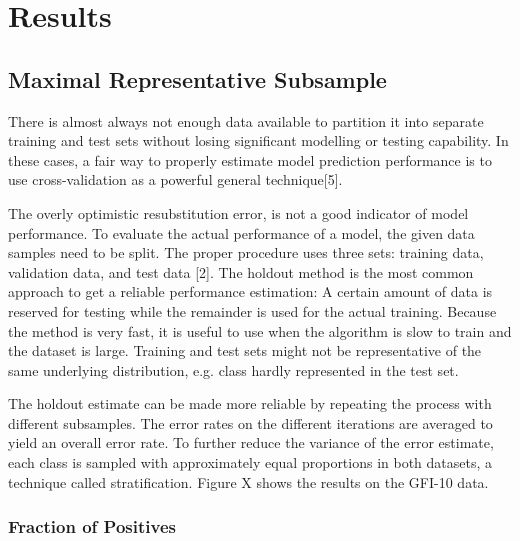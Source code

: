 \chapter{Results}\label{Sec:Results}

\section{Maximal Representative Subsample}
 
There is almost always not enough data available to partition it into separate training and test sets without losing signiﬁcant modelling or testing capability. In these cases, a fair way to properly estimate model prediction performance is to use cross-validation as a powerful general technique[5].

The overly optimistic resubstitution error, is not a good indicator of model performance. To evaluate the actual performance of a model, the given data samples need to be split. The proper procedure uses three sets: training data, validation data, and test data [2]. The holdout method is the most common approach to get a reliable performance estimation: A certain amount of data is reserved for testing while the remainder is used for the actual training. Because the method is very fast, it is useful to use when the algorithm is slow to train and the dataset is large. Training and test sets might not be representative of the same underlying distribution, e.g. class hardly represented in the test set.

 The holdout estimate can be made more reliable by repeating the process with different subsamples. The error rates on the different iterations are averaged to yield an overall error rate. To further reduce the variance of the error estimate, each class is sampled with approximately equal proportions in both datasets, a technique called stratiﬁcation. Figure X shows the results on the GFI-10 data.

\subsection{Fraction of Positives}

